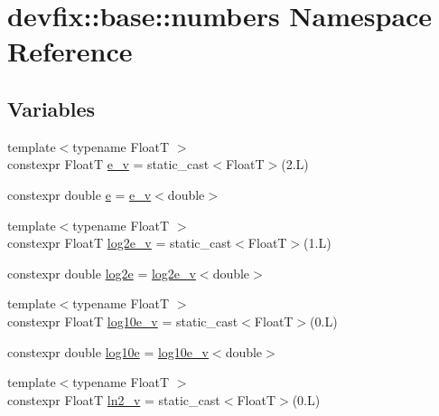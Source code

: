 \hypertarget{namespacedevfix_1_1base_1_1numbers}{}\section{devfix\+:\+:base\+:\+:numbers Namespace Reference}
\label{namespacedevfix_1_1base_1_1numbers}
\subsection*{Variables}
\begin{DoxyCompactItemize}
\item 
{\footnotesize template$<$typename FloatT $>$ }\\constexpr FloatT \hyperlink{namespacedevfix_1_1base_1_1numbers_a11634193bb03cbb76be900ae781d238a}{e\+\_\+v} = static\+\_\+cast$<$FloatT$>$(2.\+L)
\item 
constexpr double \hyperlink{namespacedevfix_1_1base_1_1numbers_abe3d84907a3ddf233c18d66f501be208}{e} = \hyperlink{namespacedevfix_1_1base_1_1numbers_a11634193bb03cbb76be900ae781d238a}{e\+\_\+v}$<$double$>$
\item 
{\footnotesize template$<$typename FloatT $>$ }\\constexpr FloatT \hyperlink{namespacedevfix_1_1base_1_1numbers_ae6f0f450df0456294f5cda7ff81aaf75}{log2e\+\_\+v} = static\+\_\+cast$<$FloatT$>$(1.\+L)
\item 
constexpr double \hyperlink{namespacedevfix_1_1base_1_1numbers_ad39ab3b2dfe11a8ad067d57dd0073ad6}{log2e} = \hyperlink{namespacedevfix_1_1base_1_1numbers_ae6f0f450df0456294f5cda7ff81aaf75}{log2e\+\_\+v}$<$double$>$
\item 
{\footnotesize template$<$typename FloatT $>$ }\\constexpr FloatT \hyperlink{namespacedevfix_1_1base_1_1numbers_a0cd1d1b3283aacc67f5ed5b3bfa4b09f}{log10e\+\_\+v} = static\+\_\+cast$<$FloatT$>$(0.\+L)
\item 
constexpr double \hyperlink{namespacedevfix_1_1base_1_1numbers_aab8574ca875ab6b6d92940ea7c4b089f}{log10e} = \hyperlink{namespacedevfix_1_1base_1_1numbers_a0cd1d1b3283aacc67f5ed5b3bfa4b09f}{log10e\+\_\+v}$<$double$>$
\item 
{\footnotesize template$<$typename FloatT $>$ }\\constexpr FloatT \hyperlink{namespacedevfix_1_1base_1_1numbers_a6fa1c65988b6d3574b4916b6423fc217}{ln2\+\_\+v} = static\+\_\+cast$<$FloatT$>$(0.\+L)

\end{DoxyCompactItemize}
